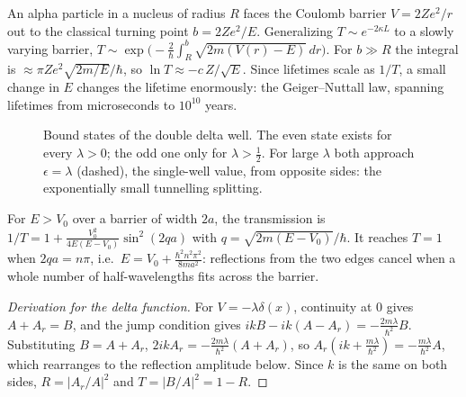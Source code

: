 \begin{example}
An alpha particle in a nucleus of radius $R$ faces the Coulomb barrier $V = 2Ze^2/r$ out to the classical turning point $b = 2Ze^2/E$. Generalizing $T\sim e^{-2\kappa L}$ to a slowly varying barrier, $T\sim\exp\bigl(-\frac2\hbar\int_R^b\sqrt{2m(V(r)-E)}\,dr\bigr)$. For $b\gg R$ the integral is $\approx\pi Ze^2\sqrt{2m/E}/\hbar$, so $\ln T\approx-c\,Z/\sqrt{E}$. Since lifetimes scale as $1/T$, a small change in $E$ changes the lifetime enormously: the Geiger--Nuttall law, spanning lifetimes from microseconds to $10^{10}$ years.
\end{example}

\begin{figure}[ht]
\centering
{}
\caption{Bound states of the double delta well. The even state exists for every $\lambda>0$; the odd one only for $\lambda>\frac12$. For large $\lambda$ both approach $\epsilon = \lambda$ (dashed), the single-well value, from opposite sides: the exponentially small tunnelling splitting.}
\end{figure}

\begin{fact}
For $E>V_0$ over a barrier of width $2a$, the transmission is $1/T = 1 + \frac{V_0^2}{4E(E-V_0)}\sin^2(2qa)$ with $q = \sqrt{2m(E-V_0)}/\hbar$. It reaches $T = 1$ when $2qa = n\pi$, i.e.\ $E = V_0 + \frac{\hbar^2n^2\pi^2}{8ma^2}$: reflections from the two edges cancel when a whole number of half-wavelengths fits across the barrier.
\end{fact}

\begin{proof}[Derivation for the delta function]
For $V = -\lambda\delta(x)$, continuity at $0$ gives $A + A_r = B$, and the jump condition gives $ikB - ik(A - A_r) = -\frac{2m\lambda}{\hbar^2}B$. Substituting $B = A + A_r$, $2ikA_r = -\frac{2m\lambda}{\hbar^2}(A+A_r)$, so $A_r(ik + \frac{m\lambda}{\hbar^2}) = -\frac{m\lambda}{\hbar^2}A$, which rearranges to the reflection amplitude below. Since $k$ is the same on both sides, $R = |A_r/A|^2$ and $T = |B/A|^2 = 1-R$.
\end{proof}

